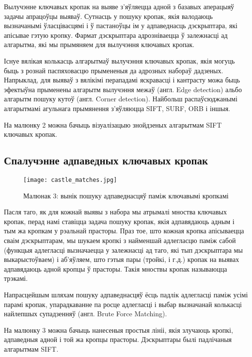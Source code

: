 Вылучэнне ключавых кропак на выяве з'яўляецца адной з базавых аперацыяў задачы апрацоўцы выяваў. Сутнасць у пошуку кропак, якія валодаюць вызначанымі ўласцівасцямі і ў пастаноўцы ім у адпаведнасць дэскрыптара, які апісывае гэтую кропку. Фармат дэскрыптара адрозніваецца ў залежнасці ад алгарытма, які мы прымяняем для вылучэння ключавых кропак.\par
Існуе вялікая колькасць алгарытмаў вылучэння ключавых кропак, якія могуць быць з рознай паспяховасцю прымененыя да адрозных набораў дадзеных. Напрыклад, для выяваў з вялікімі перападамі яскравасці і кантрасту можа быць эфектыўна прыменены алгарытм вылучэння межаў (англ. Edge detection) альбо алгарытм пошуку кутоў (англ. Corner detection). Найбольш распаўсюджанымі алгарытмамі агульнага прымянення з'яўляюцца SIFT, SURF, ORB і іншыя.\par 
На малюнку 2 можна бачыць візуалізацыю знойдзеных алгарытмам SIFT ключавых кропак.\par

\subsection*{Спалучэнне адпаведных ключавых кропак}

\begin{figure}[h]
    \centering
    \texttt{[image: castle\_matches.jpg]}
    \captionsetup{labelformat=empty}
    \caption{Малюнак 3: вынік пошуку адпаведнасцяў паміж ключавымі кропкамі}
    \label{fig:matches}
\end{figure}

Пасля таго, як для кожнай выявы з набора мы атрымалі мноства ключавых кропак, перад намі ставіцца задача пошуку кропак, якія адпавядаюць адным і тым жа кропкам у рэальнай прасторы. Праз тое, што кожная кропка апісываецца сваім дэскрыптарам, мы шукаем кропкі з найменшай адлегласцю паміж сабой (функцыя адлегласці вызначаецца у залежнасці ад таго, які тып дэскрыптара мы выкарыстоўваем) і аб'яўляем, што гэтыя пары (тройкі, і г.д.) кропак на выявах адпавядаюць адной кропцы ў прасторы. Такія мноствы кропак называюцца трэкамі.\par
Напрасцейшым шляхам пошуку адпаведнасцяў ёсць падлік адлегласці паміж усімі парамі кропак, упарадкаванне па росце адлегласці і выбар вызначанай колькасці найлепшых супадзенняў (англ. Brute Force Matching).\par
На малюнку 3 можна бачыць нанесеныя простыя лініі, якія злучаюць кропкі, адпаведныя адной і той жа кропцы прасторы. Дэскрыптары былі падлічаныя алгарытмам SIFT.
 
